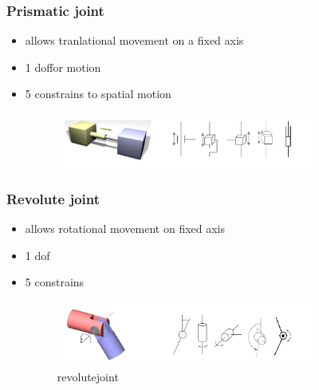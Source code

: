 \documentclass{article}
\begin{document}
\subsubsection{Prismatic joint}
\begin{itemize}
	\item allows tranlational movement on a fixed axis
	\item 1 doffor motion
	\item 5 constrains to spatial motion
	      \begin{figure}[htpb]
		      \centering
		      \includegraphics[width=0.8\textwidth]{prismaticjoint}
		      \caption{}
		      \label{fig:}
	      \end{figure}
\end{itemize}
\subsubsection{Revolute joint}
\begin{itemize}
	\item allows rotational movement on fixed axis
	\item 1 dof
	\item 5 constrains
	      \begin{figure}[htpb]
		      \centering
		      \includegraphics[width=0.8\textwidth]{revolutejoint}
		      \caption{revolutejoint}
		      \label{fig:revolutejoint}
	      \end{figure}
\end{itemize}
\newpage
\end{document}
